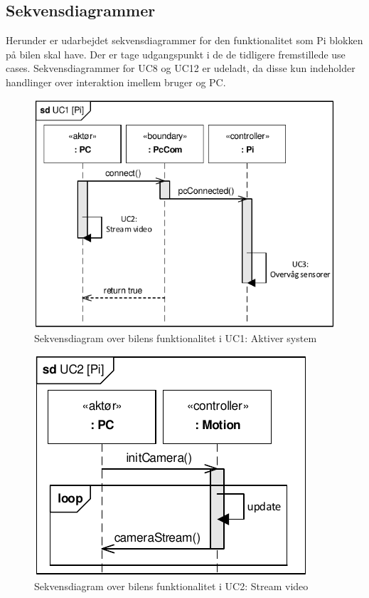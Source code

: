 \clearpage

\subsection{Sekvensdiagrammer}
Herunder er udarbejdet sekvensdiagrammer for den funktionalitet som Pi blokken på bilen skal have. Der er tage udgangspunkt i de de tidligere fremstillede use cases. Sekvensdiagrammer for UC8 og UC12 er udeladt, da disse kun indeholder handlinger over interaktion imellem bruger og PC.

\begin{figure}[h]
\centering
\includegraphics[]{../fig/diagrammer/bil/sd_uc1.pdf}
\caption{Sekvensdiagram over  bilens funktionalitet i UC1: Aktiver system}
\label{fig:sd_uc1_bil}
\end{figure}

\begin{figure}[h]
\centering
\includegraphics[]{../fig/diagrammer/bil/sd_uc2.pdf}
\caption{Sekvensdiagram over  bilens funktionalitet i UC2: Stream video}
\label{fig:sd_uc2_bil}
\end{figure}


